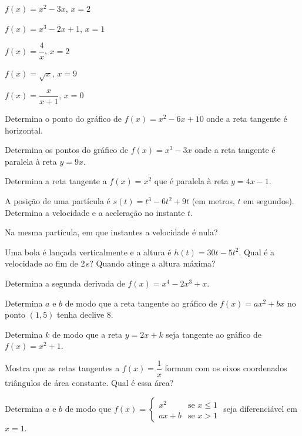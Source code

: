 \documentclass[12pt]{article}
\begin{document}
\begin{exercicios}
  \item $f(x) = x^2 - 3x$, \; $x = 2$
  \item $f(x) = x^3 - 2x + 1$, \; $x = 1$
  \item $f(x) = \dfrac{4}{x}$, \; $x = 2$
  \item $f(x) = \sqrt{x}$, \; $x = 9$
  \item $f(x) = \dfrac{x}{x + 1}$, \; $x = 0$
  \item Determina o ponto do gráfico de $f(x) = x^2 - 6x + 10$ onde a reta tangente é horizontal.
  \item Determina os pontos do gráfico de $f(x) = x^3 - 3x$ onde a reta tangente é paralela à reta $y = 9x$.
  \item Determina a reta tangente a $f(x) = x^2$ que é paralela à reta $y = 4x - 1$.
\end{exercicios}

\begin{exercicios}
  \item A posição de uma partícula é $s(t) = t^3 - 6t^2 + 9t$ (em metros, $t$ em segundos). Determina a velocidade e a aceleração no instante $t$.
  \item Na mesma partícula, em que instantes a velocidade é nula?
  \item Uma bola é lançada verticalmente e a altura é $h(t) = 30t - 5t^2$. Qual é a velocidade ao fim de 2\,s? Quando atinge a altura máxima?
  \item Determina a segunda derivada de $f(x) = x^4 - 2x^3 + x$.
\end{exercicios}

\begin{exercicios}
  \item Determina $a$ e $b$ de modo que a reta tangente ao gráfico de $f(x) = ax^2 + bx$ no ponto $(1, 5)$ tenha declive 8.
  \item Determina $k$ de modo que a reta $y = 2x + k$ seja tangente ao gráfico de $f(x) = x^2 + 1$.
  \item Mostra que as retas tangentes a $f(x) = \dfrac{1}{x}$ formam com os eixos coordenados triângulos de área constante. Qual é essa área?
  \item Determina $a$ e $b$ de modo que $f(x) = \begin{cases} x^2 & \text{se } x \le 1 \\ ax + b & \text{se } x > 1 \end{cases}$ seja diferenciável em $x = 1$.
\end{exercicios}
\end{document}
